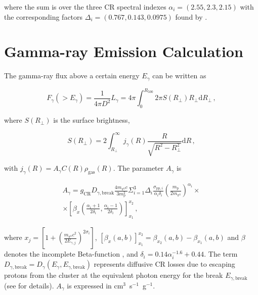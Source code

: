 \documentclass[traditabstract]{aa}
\newcommand{\rmn}{\mathrm}
\begin{document}
\begin{appendix}
where the sum is over the three CR spectral indexes $\alpha_{i}=(2.55,2.3,2.15)$ with the corresponding factors $\Delta_{i} = (0.767, 0.143, 0.0975)$ found by \cite{2010MNRAS.409..449P}. 
 


\section{Gamma-ray Emission Calculation}
\label{app:C}

The gamma-ray flux above a certain energy $E_{\gamma}$ can be written as

\begin{equation}
F_{\gamma} (>E_{\gamma}) = \frac{1}{4\pi D^{2}} L_{\gamma} = 4\pi \int_{0}^{R_{500}} 2\pi S(R_{\perp}) R_{\perp} \rmn{d}R_{\perp} \, ,
\end{equation}

where $S(R_{\perp})$ is the surface brightness,

\begin{equation}
S(R_{\perp}) = 2 \int_{R_{\perp}}^{\infty} j_{\gamma}(R) \frac{R}{\sqrt{R^{2}-R_{\perp}^{2}}} \rmn{d}R \, ,
\end{equation}

with $ j_{\gamma}(R)=A_{\gamma} C(R) \rho_{\rmn{gas}}(R)$. The parameter $A_{\gamma}$ is \citep{2010MNRAS.409..449P}

\begin{eqnarray}
A_{\gamma} = g_{\rmn{CR}} D_{\gamma,\rmn{break}} \frac{4 m_{\pi^{0}} c}{3 m_{\rmn{p}}^{2}} \Sigma_{i=1}^{3} \Delta_{i} \frac{\sigma_{\rmn{pp},i}}{\alpha_{i} \delta_{i}} \left( \frac{m_{\rmn{p}}}{2 m_{\pi^{0}}} \right)^{\alpha_{i}} \times \nonumber \\
\times \left[ \beta_{x} \left( \frac{\alpha_{i}+1}{2\delta_{i}}, \frac{\alpha_{i}-1}{2\delta_{i}} \right) \right]_{x_{1}}^{x_{2}} \, ,
\end{eqnarray}

where $x_{j}=\left[ 1 + \left( \frac{m_{\pi^{0}}c^2}{2E_{\gamma,j}} \right)^{2\sigma_{i}} \right]$, $\left[ \beta_{x}(a,b) \right]_{x_1}^{x_2} = \beta_{x_2}(a,b)-\beta_{x_1}(a,b)$ and $\beta$ denotes the incomplete Beta-function \citep{1965hmfw.book.....A}, and $\delta_{i}=0.14\alpha_{i}^{-1.6}+0.44$. The term $D_{\gamma, \rmn{break}}=D_{\gamma}(E_{\gamma},E_{\gamma,\rmn{break}})$ represents diffusive CR losses due to escaping protons from the cluster at the equivalent photon energy for the break $E_{\gamma, \rmn{break}}$ (see \citealp{2010MNRAS.409..449P} for details). $A_{\gamma}$ is expressed in cm$^3$~s$^{-1}$~g$^{-1}$. 


\end{appendix}
\end{document}
